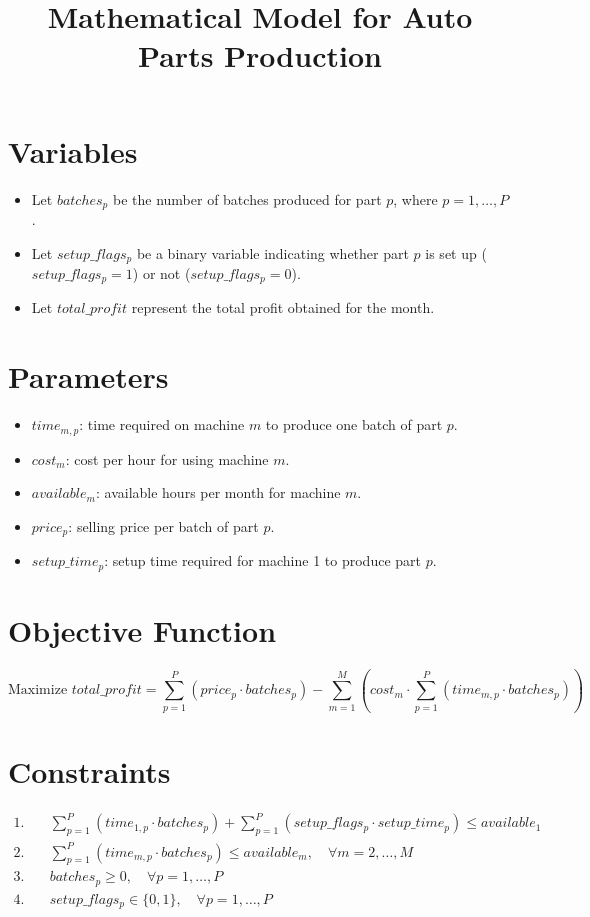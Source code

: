 \documentclass{article}
\begin{document}
\title{Mathematical Model for Auto Parts Production}
\author{}
\date{}
\maketitle

\section*{Variables}
\begin{itemize}
    \item Let \(batches_{p}\) be the number of batches produced for part \(p\), where \(p = 1, \ldots, P\).
    \item Let \(setup\_flags_{p}\) be a binary variable indicating whether part \(p\) is set up (\(setup\_flags_{p} = 1\)) or not (\(setup\_flags_{p} = 0\)).
    \item Let \(total\_profit\) represent the total profit obtained for the month.
\end{itemize}

\section*{Parameters}
\begin{itemize}
    \item \(time_{m,p}\): time required on machine \(m\) to produce one batch of part \(p\).
    \item \(cost_{m}\): cost per hour for using machine \(m\).
    \item \(available_{m}\): available hours per month for machine \(m\).
    \item \(price_{p}\): selling price per batch of part \(p\).
    \item \(setup\_time_{p}\): setup time required for machine 1 to produce part \(p\).
\end{itemize}

\section*{Objective Function}
\[
\text{Maximize } total\_profit = \sum_{p=1}^{P} (price_{p} \cdot batches_{p}) - \sum_{m=1}^{M} \left( cost_{m} \cdot \sum_{p=1}^{P} (time_{m,p} \cdot batches_{p}) \right)
\]

\section*{Constraints}
\begin{align*}
1. & \quad \sum_{p=1}^{P} (time_{1,p} \cdot batches_{p}) + \sum_{p=1}^{P} (setup\_flags_{p} \cdot setup\_time_{p}) \leq available_{1} \\
2. & \quad \sum_{p=1}^{P} (time_{m,p} \cdot batches_{p}) \leq available_{m}, \quad \forall m = 2, \ldots, M \\
3. & \quad batches_{p} \geq 0, \quad \forall p = 1, \ldots, P \\
4. & \quad setup\_flags_{p} \in \{0, 1\}, \quad \forall p = 1, \ldots, P
\end{align*}
\end{document}
